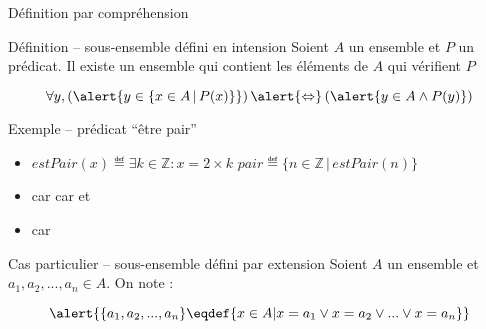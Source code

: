 
\begingroup



\begin{frame}{Définition par compréhension}
  \begin{block}{Définition -- sous-ensemble défini en intension}
    Soient $A$ un ensemble et $P$ un prédicat.
    Il existe un ensemble  qui contient les éléments de $A$ qui vérifient $P$

    \vspace{-2mm}
    $$\forall y, \left(\alert{y\in \{x \in A \,|\, P(x)\}}\right) \alert{\Leftrightarrow} \left(\alert{y\in A \land P(y)}\right)$$
  \end{block}
  \begin{exampleblock}{Exemple -- prédicat ``être pair''}
    \begin{itemize}
    \item $\mathit{estPair}(x) \eqdef \exists k\in \mathbb{Z} : x = 2\times k$  \hspace{\fill} $\mathit{pair} \eqdef \{n\in \mathbb{Z} \,|\, \mathit{estPair}(n)\}$
    \item {} car  \hspace{\fill}   car  et 
    \item {} car 
    \end{itemize}
  \end{exampleblock}

  \begin{block}{Cas particulier -- sous-ensemble défini par extension}
    Soient $A$ un ensemble et $a_1, a_2, ..., a_n \in A$. On note :
    
    \vspace{-2mm}
    $$\alert{\{a_1, a_2, ..., a_n\} \eqdef \{x\in A | x=a_1 \lor x=a_2 \lor ... \lor x=a_n\}}$$
  \end{block}

\end{frame}

\endgroup
